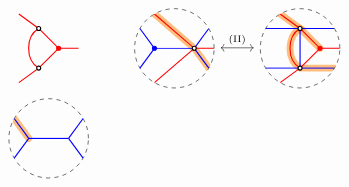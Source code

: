 \begin{figure}[ht]
\[\begin{tikzcd}[row sep=0pc]
\begin{tikzpicture}[baseline=-.5ex]
\draw [red, thick] (5/2,{sqrt(3)/2})--(3,1/2) to[out=-150,in=150] (3,-1/2)--(5/2,{-sqrt(3)/2});
\draw [red, thick] (3,1/2)--(7/2,0) -- (4,0);
\draw [red, thick] (3,-1/2)--(7/2,0);

\draw[thick,black,fill=white] (3,1/2) circle (0.05);
\draw[thick,black,fill=white] (3,-1/2) circle (0.05);
\draw[thick,red,fill=red] (7/2,0) circle (0.05);
\end{tikzpicture}
&
\begin{tikzpicture}[baseline=-.5ex]
\draw [dashed] (0,0) circle [radius=1];%
\clip (0,0) circle (1);
\draw [color=cyclecolor1, line cap=round, line width=5, opacity=0.5] (-1/2,{sqrt(3)/2}) -- (1/2,0)--({sqrt(3)/2},-1/2);
\draw [blue, thick] ({-sqrt(3)/2},1/2)--(-1/2,0);
\draw [blue, thick] ({-sqrt(3)/2},-1/2)--(-1/2,0);
\draw [blue, thick] ({sqrt(3)/2},1/2)--(1/2,0);
\draw [blue, thick] ({sqrt(3)/2},-1/2)--(1/2,0);
\draw [blue, thick] (-1/2,0)--(1/2,0);

\draw [red, thick] (-1/2,{sqrt(3)/2}) -- (1/2,0)--(1,0);
\draw [red, thick] (-1/2,{-sqrt(3)/2}) -- (1/2,0);

\draw[thick,blue,fill=blue] (-1/2,0) circle (0.05);
\draw[thick,black,fill=white] (1/2,0) circle (0.05);
\end{tikzpicture}
\arrow[leftrightarrow,r,"\Move{II}"]&
\begin{tikzpicture}[baseline=-.5ex]
\draw [dashed] (3,0) circle [radius=1];%
\clip (3,0) circle (1);
\draw [color=cyclecolor1, line cap=round, line width=5, opacity=0.5] (5/2,{sqrt(3)/2})--(3,1/2) to[out=-150,in=150] (3,-1/2)--({3+sqrt(3)/2},-1/2);
\draw [color=cyclecolor1, line cap=round, line width=5, opacity=0.5] (3.5,0)--(3,1/2);
\draw [blue, thick] ({3-sqrt(3)/2},1/2)--({3+sqrt(3)/2},1/2);
\draw [blue, thick] ({3-sqrt(3)/2},-1/2)--({3+sqrt(3)/2},-1/2);
\draw [blue, thick] (3,1/2)--(3,-1/2);

\draw [red, thick] (5/2,{sqrt(3)/2})--(3,1/2) to[out=-150,in=150] (3,-1/2)--(5/2,{-sqrt(3)/2});
\draw [red, thick] (3,1/2)--(7/2,0) -- (4,0);
\draw [red, thick] (3,-1/2)--(7/2,0);

\draw[thick,black,fill=white] (3,1/2) circle (0.05);
\draw[thick,black,fill=white] (3,-1/2) circle (0.05);
\draw[thick,red,fill=red] (7/2,0) circle (0.05);
\end{tikzpicture}
\\
\begin{tikzpicture}[baseline=-.5ex]
\draw [dashed] (0,0) circle [radius=1];%
\clip (0,0) circle (1);
\draw [color=cyclecolor1, line cap=round, line width=5, opacity=0.5] ({-sqrt(3)/2},1/2)--(-1/2,0);
\draw [blue, thick] ({-sqrt(3)/2},1/2)--(-1/2,0);
\draw [blue, thick] ({-sqrt(3)/2},-1/2)--(-1/2,0);
\draw [blue, thick] ({sqrt(3)/2},1/2)--(1/2,0);
\draw [blue, thick] ({sqrt(3)/2},-1/2)--(1/2,0);
\draw [blue, thick] (-1/2,0)--(1/2,0);


\end{tikzpicture}
\end{tikzcd}\]
\end{figure}
